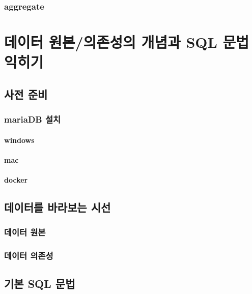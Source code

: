 \documentclass[]{book}
\theoremstyle{definition}
\theoremstyle{definition}
\theoremstyle{remark}
\begin{document}
\subsection{aggregate}\label{aggregate}

\chapter{데이터 원본/의존성의 개념과 SQL 문법 익히기}\label{sql}

\section{사전 준비}\label{prerequisite}

\subsection{mariaDB 설치}\label{install-mariadb}

\subsubsection{windows}\label{mariadb-windows}

\subsubsection{mac}\label{mariadb-mac}

\subsubsection{docker}\label{mariadb-docker}

\section{데이터를 바라보는 시선}\label{for-data}

\subsection{데이터 원본}\label{original-data}

\subsection{데이터 의존성}\label{data-dependency}

\section{기본 SQL 문법}\label{basic-sql}
\end{document}
